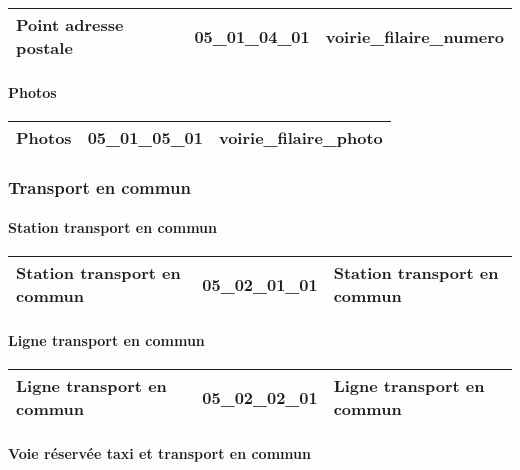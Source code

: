\documentclass[12pt,titlepage,oneside]{book}
\begin{document}
\renewcommand{\arraystretch}{1.2}
\begin{supertabular}{|p{10cm}|c|p{15cm}|}
 Point adresse postale & 05\_01\_04\_01 & voirie\_filaire\_numero\\
\hline
\end{supertabular}


\paragraph{Photos}
\noindent
\vspace{\baselineskip}

\renewcommand{\arraystretch}{1.2}
\begin{supertabular}{|p{10cm}|c|p{15cm}|}
 Photos & 05\_01\_05\_01 & voirie\_filaire\_photo\\
\hline
\end{supertabular}

\subsubsection{\large Transport en commun}
\paragraph{Station transport en commun}
\noindent
\vspace{\baselineskip}

\renewcommand{\arraystretch}{1.2}
\begin{supertabular}{|p{10cm}|c|p{15cm}|}
 Station transport en commun & 05\_02\_01\_01 & Station transport en commun\\
\hline
\end{supertabular}


\paragraph{Ligne transport en commun}
\noindent
\vspace{\baselineskip}

\renewcommand{\arraystretch}{1.2}
\begin{supertabular}{|p{10cm}|c|p{15cm}|}
 Ligne transport en commun & 05\_02\_02\_01 & Ligne transport en commun\\
\hline
\end{supertabular}


\paragraph{Voie réservée taxi et transport en commun}
\noindent
\vspace{\baselineskip}
\end{document}

